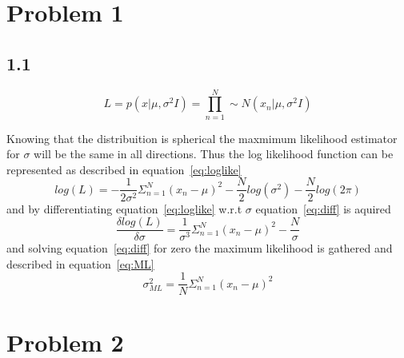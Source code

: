 \documentclass{article}
\begin{document}





\section*{Problem 1}
\subsection*{1.1}

\begin{equation}
L = p(x|\mu,\sigma^2I) = \prod_{n=1}^N \sim  {N}(x_n|\mu,\sigma^2I)
\label{eq:likelihood}
\end{equation}


\noindent Knowing that the distribuition is spherical the maxmimum likelihood estimator for $\sigma$ will be the same in all directions. Thus the log likelihood function can be represented as described in equation~\ref{eq:loglike}
\begin{equation}
log(L) =-\frac{1}{2\sigma^2}\Sigma_{n=1}^N(x_n-\mu)^2 - \frac{N}{2}log(\sigma^2) - \frac{N}{2}log(2\pi)
\label{eq:loglike}
\end{equation}
and by differentiating equation~\ref{eq:loglike} w.r.t $\sigma$ equation~\ref{eq:diff} is aquired
\begin{equation}
	\frac{\delta log(L)}{\delta \sigma} = \frac{1}{\sigma^3}\Sigma_{n=1}^N(x_n-\mu)^2 - \frac{N}{\sigma}
	\label{eq:diff}
\end{equation}
and solving equation~\ref{eq:diff} for zero the maximum likelihood is gathered and described in equation~\ref{eq:ML}
\begin{equation}
	\sigma_{ML}^2 = \frac{1}{N}\Sigma_{n=1}^N(x_n-\mu)^2 
\end{equation}

\newpage 



\section*{Problem 2}
\end{document}
